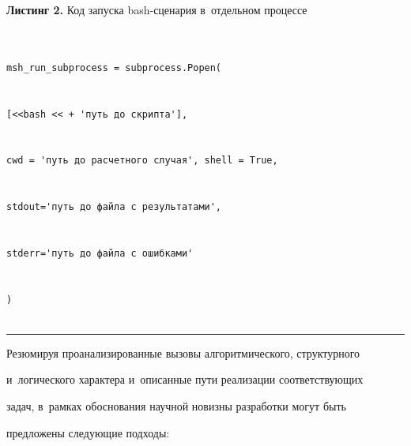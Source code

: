 \vspace*{3pt}





\noindent


\textbf{Листинг 2.} {\small Код запуска bash-сценария в~отдельном процессе}  


{\small \begin{verbatim}


msh_run_subprocess = subprocess.Popen(


[<<bash << + 'путь до скрипта'], 


cwd = 'путь до расчетного случая', shell = True, 


stdout='путь до файла с результатами', 


stderr='путь до файла с ошибками'


)


\end{verbatim}


}





\vspace*{3pt}





\hrule





\vspace*{6pt}












   Резюмируя проанализированные вызовы алгоритмического, структурного 


и~логического характера и~описанные пути реализации соответствующих 


задач, в~рамках обоснования научной новизны разработки могут быть 


предложены следующие подходы:


